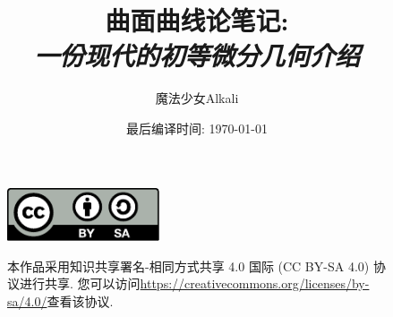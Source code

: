 \documentclass[11pt,draft]{book}
\title{曲面曲线论笔记:\\{\itshape\Large 一份现代的初等微分几何介绍}}
\author{魔法少女Alkali}
\affil{北京师范大学数学科学学院}
\date{最后编译时间: \today}
\numberwithin{equation}{section}
\begin{document}
    \maketitle
    \vspace*{13cm}
    \thispagestyle{empty}
    \begin{figure}[ht]
        \includegraphics[width=0.4\textwidth]{figures/by-sa.pdf}\hspace{0.05\textwidth}
        \begin{minipage}[b]{0.54\textwidth} %
        \small
        本作品采用知识共享署名-相同方式共享 4.0 国际 (CC BY-SA 4.0) 协议进行共享.
        您可以访问\url{https://creativecommons.org/licenses/by-sa/4.0/}查看该协议.
        \end{minipage}
    \end{figure}

    \frontmatter
    

    \tableofcontents

    \mainmatter
    
    
    
    
    

    \appendix
    \printbibliography[title={参考文献},heading=bibintoc]
\end{document}
